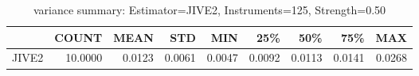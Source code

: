 \begin{table}[ht]
\centering
\caption{variance summary: Estimator=JIVE2, Instruments=125, Strength=0.50}
\begin{tabular}{lrrrrrrrr}
\toprule
 & COUNT & MEAN & STD & MIN & 25\% & 50\% & 75\% & MAX \\
\midrule
JIVE2 & 10.0000 & 0.0123 & 0.0061 & 0.0047 & 0.0092 & 0.0113 & 0.0141 & 0.0268 \\
\bottomrule
\end{tabular}
\end{table}
